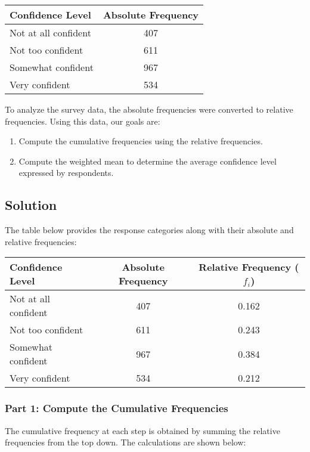 \documentclass{article}
\begin{document}
\begin{center}
\begin{tabular}{|l|c|}
\hline
\textbf{Confidence Level} & \textbf{Absolute Frequency} \\
\hline
Not at all confident & 407 \\
Not too confident & 611 \\
Somewhat confident & 967 \\
Very confident & 534 \\
\hline
\end{tabular}
\end{center}

To analyze the survey data, the absolute frequencies were converted to relative frequencies. Using this data, our goals are:
\begin{enumerate}
    \item Compute the cumulative frequencies using the relative frequencies.
    \item Compute the weighted mean to determine the average confidence level expressed by respondents.
\end{enumerate}

\subsection*{Solution}

The table below provides the response categories along with their absolute and relative frequencies:

\begin{center}
\begin{tabular}{|l|c|c|}
\hline
\textbf{Confidence Level} & \textbf{Absolute Frequency} & \textbf{Relative Frequency} (\( f_i \)) \\
\hline
Not at all confident & 407 & 0.162 \\
Not too confident & 611 & 0.243 \\
Somewhat confident & 967 & 0.384 \\
Very confident & 534 & 0.212 \\
\hline
\end{tabular}
\end{center}

\subsubsection*{Part 1: Compute the Cumulative Frequencies}

The cumulative frequency at each step is obtained by summing the relative frequencies from the top down. The calculations are shown below:
\end{document}
